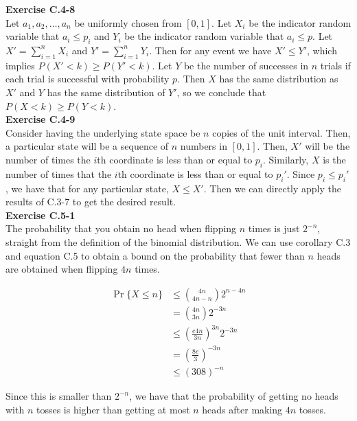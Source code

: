 \documentclass{article}
\begin{document}
\noindent\textbf{Exercise C.4-8}\\

Let $a_1, a_2, \ldots, a_n$ be uniformly chosen from $[0,1]$. Let $X_i$ be the indicator random variable that $a_i \leq p_i$ and $Y_i$ be the indicator random variable that $a_i \leq p$.  Let $X' = \sum_{i=1}^n X_i$ and $Y'=\sum_{i=1}^nY_i$.  Then for any event we have $X' \leq Y'$, which implies $P(X' < k) \geq P(Y'<k)$.  Let $Y$ be the number of successes in $n$ trials if each trial is successful with probability $p$.  Then $X$ has the same distribution as $X'$ and $Y$ has the same distribution of $Y'$, so we conclude that $P(X<k) \geq P(Y<k)$. \\

\noindent\textbf{Exercise C.4-9}\\

Consider having the underlying state space be $n$ copies of the unit interval. Then, a particular state will be a sequence of $n$ numbers in $[0,1]$. Then, $X'$ will be the number of times the $i$th coordinate is less than or equal to $p_i$. Similarly, $X$ is the number of times that the $i$th coordinate is less than or equal to $p_i'$. Since $p_i \le p_i'$, we have that for any particular state, $X\le X'$. Then we can directly apply the results of C.3-7 to get the desired result.\\


\noindent\textbf{Exercise C.5-1}\\

The probability that you obtain no head when flipping $n$ times is just $2^{-n}$, straight from the definition of the binomial distribution. We can use corollary C.3 and equation C.5 to obtain a bound on the probability that fewer than $n$ heads are obtained when flipping $4n$ times. 

\begin{align*}
\Pr\{X \le n\} &\le \binom{4n}{4n-n}2^{n-4n}\\
& = \binom{4n}{3n}2^{-3n}\\
& \le \left(\frac{e4n}{3n}\right)^{3n} 2^{-3n}\\
& = \left(\frac{8e}{3}\right)^{-3n} \\
& \le (308)^{-n}
\end{align*}

Since this is smaller than $2^{-n}$, we have that the probability of getting no heads with $n$ tosses is higher than getting at most $n$ heads after making $4n$ tosses.\\
\end{document}
